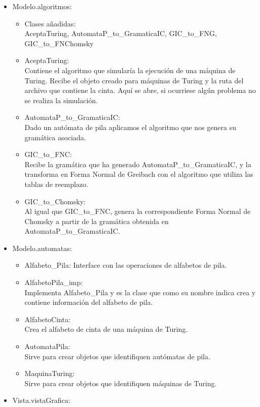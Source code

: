\documentclass[12pt,a4paper,spanish]{book}
\begin{document}
\begin{itemize}
\item Modelo.algoritmos:
\begin{itemize}
\item Clases a\~nadidas:\\AceptaTuring, AutomataP\_to\_GramaticaIC, GIC\_to\_FNG,\\GIC\_to\_FNChomsky
\item AceptaTuring:\\Contiene el algoritmo que simular\'ia la ejecuci\'on de una m\'aquina de Turing. Recibe el objeto creado para m\'aquinas de Turing y la ruta del archivo que contiene la cinta. Aqu\'i se abre, si ocurriese alg\'un problema no se realiza la simulaci\'on.
\item AutomataP\_to\_GramaticaIC:\\Dado un aut\'omata de pila aplicamos el algoritmo que nos genera su gram\'atica asociada.
\item GIC\_to\_FNC:\\Recibe la gram\'atica que ha generado AutomataP\_to\_GramaticaIC, y la transforma en Forma Normal de Greibach con el algoritmo que utiliza las tablas de reemplazo.
\item GIC\_to\_Chomsky:\\Al igual que GIC\_to\_FNC, genera la correspondiente Forma Normal de Chomsky a partir de la gram\'atica obtenida en AutomataP\_to\_GramaticaIC.
\end{itemize}
\item Modelo.automatas:
\begin{itemize}
\item Alfabeto\_Pila: Interface con las operaciones de alfabetos de pila.
\item AlfabetoPila\_imp:\\Implementa Alfabeto\_Pila y es la clase que como su nombre indica crea y contiene informaci\'on del alfabeto de pila.
\item AlfabetoCinta:\\Crea el alfabeto de cinta de una m\'aquina de Turing.
\item AutomataPila:\\Sirve para crear objetos que identifiquen aut\'omatas de pila.
\item MaquinaTuring:\\Sirve para crear objetos que identifiquen m\'aquinas de Turing.
\end{itemize}
\item Vista.vistaGrafica:
\begin{itemize}

\end{itemize}
\end{itemize}
\end{document}
